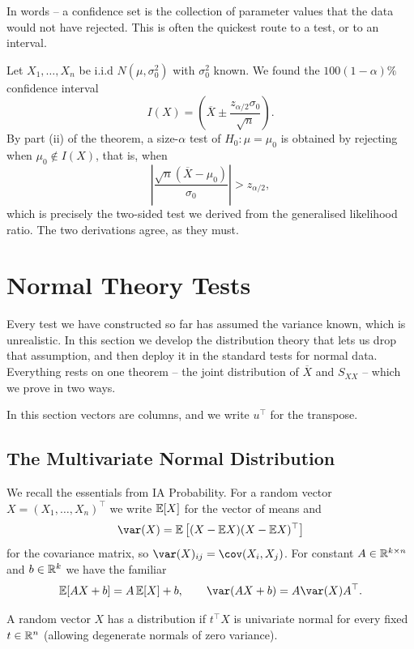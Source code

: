 \documentclass[a4paper]{scrartcl}
\begin{document}
In words -- a confidence set is the collection of parameter values that the data would not have rejected. This is often the quickest route to a test, or to an interval.

\begin{example}
  Let $X_1,\dots,X_n$ be i.i.d $N(\mu,\sigma_0^2)$ with $\sigma_0^2$ known. We found the $100(1-\alpha)\%$ confidence interval
  $$
  I(X) = \left(\overline{X} \pm \frac{z_{\alpha/2}\sigma_0}{\sqrt{n}}\right).
  $$
  By part (ii) of the theorem, a size-$\alpha$ test of $H_0 : \mu = \mu_0$ is obtained by rejecting when $\mu_0 \notin I(X)$, that is, when
  $$
  \left|\frac{\sqrt{n}(\overline{X}-\mu_0)}{\sigma_0}\right| > z_{\alpha/2},
  $$
  which is precisely the two-sided test we derived from the generalised likelihood ratio. The two derivations agree, as they must.
\end{example}


\section{Normal Theory Tests}

Every test we have constructed so far has assumed the variance known, which is unrealistic. In this section we develop the distribution theory that lets us drop that assumption, and then deploy it in the standard tests for normal data. Everything rests on one theorem -- the joint distribution of $\overline{X}$ and $S_{XX}$ -- which we prove in two ways.

In this section vectors are columns, and we write $u^\top$ for the transpose.

\subsection{The Multivariate Normal Distribution}

We recall the essentials from IA Probability. For a random vector $X = (X_1,\dots,X_n)^\top$ we write $\mathbb{E}[X]$ for the vector of means and
$$
\var(X) = \EE\left[(X - \EE X)(X - \EE X)^\top\right]
$$
for the covariance matrix, so $\var(X)_{ij} = \cov(X_i, X_j)$. For constant $A \in \mathbb{R}^{k\times n}$ and $b \in \mathbb{R}^k$ we have the familiar
$$
\EE[AX + b] = A\,\EE[X] + b, \qquad \var(AX+b) = A\var(X)A^\top.
$$

\begin{definition}
  A random vector $X$ has a  distribution if $t^\top X$ is univariate normal for every fixed $t \in \mathbb{R}^n$ (allowing degenerate normals of zero variance).
\end{definition}
\end{document}
